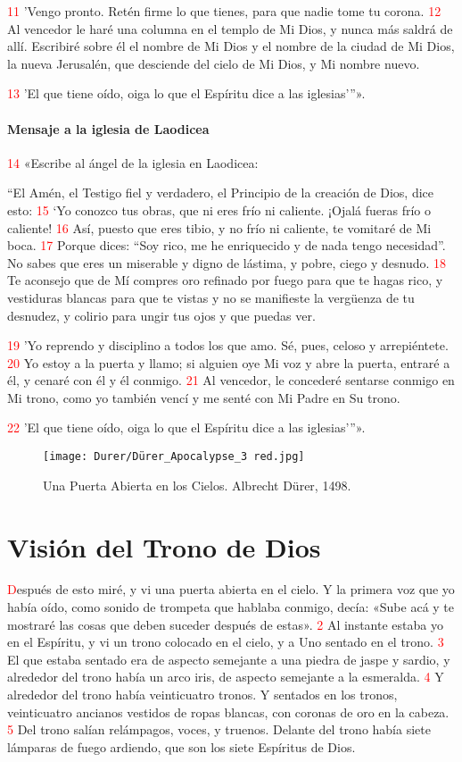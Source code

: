 \documentclass[12pt,twocolumn,twoside]{book}
\newcommand{\vnum}[1]{\textcolor{red}{\normalsize{#1}}}
\begin{document}
\vnum{11} ’Vengo pronto. Retén firme lo que tienes, para que nadie tome tu corona. %
\vnum{12} Al vencedor le haré una columna en el templo de Mi Dios, y nunca más saldrá de allí. Escribiré sobre él el nombre de Mi Dios y el nombre de la ciudad de Mi Dios, la nueva Jerusalén, que desciende del cielo de Mi Dios, y Mi nombre nuevo.

\vnum{13} ’El que tiene oído, oiga lo que el Espíritu dice a las iglesias’”».
\subsubsection*{Mensaje a la iglesia de Laodicea}
\vnum{14} «Escribe al ángel de la iglesia en Laodicea:

“El Amén, el Testigo fiel y verdadero, el Principio de la creación de Dios, dice esto: %
\vnum{15} ‘Yo conozco tus obras, que ni eres frío ni caliente. ¡Ojalá fueras frío o caliente! %
\vnum{16} Así, puesto que eres tibio, y no frío ni caliente, te vomitaré de Mi boca. %
\vnum{17} Porque dices: “Soy rico, me he enriquecido y de nada tengo necesidad”. No sabes que eres un miserable y digno de lástima, y pobre, ciego y desnudo. %
\vnum{18} Te aconsejo que de Mí compres oro refinado por fuego para que te hagas rico, y vestiduras blancas para que te vistas y no se manifieste la vergüenza de tu desnudez, y colirio para ungir tus ojos y que puedas ver.

\vnum{19} ’Yo reprendo y disciplino a todos los que amo. Sé, pues, celoso y arrepiéntete. %
\vnum{20} Yo estoy a la puerta y llamo; si alguien oye Mi voz y abre la puerta, entraré a él, y cenaré con él y él conmigo. %
\vnum{21} Al vencedor, le concederé sentarse conmigo en Mi trono, como yo también vencí y me senté con Mi Padre en Su trono.

\vnum{22} ’El que tiene oído, oiga lo que el Espíritu dice a las iglesias’”».
\clearpage

\begin{figure*}[p!]
	\centering
       \texttt{[image: Durer/Dürer\_Apocalypse\_3 red.jpg]}    
    	\caption{Una Puerta Abierta en los Cielos. Albrecht Dürer, 1498.}
\end{figure*}
\chapter{Visión del Trono de Dios}
\lettrine[lines=4]{\textcolor{red}{D}}{}espués de esto miré, y vi una puerta abierta en el cielo. Y la primera voz que yo había oído, como sonido de trompeta que hablaba conmigo, decía: «Sube acá y te mostraré las cosas que deben suceder después de estas». %
\vnum{2} Al instante estaba yo en el Espíritu, y vi un trono colocado en el cielo, y a Uno sentado en el trono. %
\vnum{3} El que estaba sentado era de aspecto semejante a una piedra de jaspe y sardio, y alrededor del trono había un arco iris, de aspecto semejante a la esmeralda. %
\vnum{4} Y alrededor del trono había veinticuatro tronos. Y sentados en los tronos, veinticuatro ancianos vestidos de ropas blancas, con coronas de oro en la cabeza. %
\vnum{5} Del trono salían relámpagos, voces, y truenos. Delante del trono había siete lámparas de fuego ardiendo, que son los siete Espíritus de Dios.
\end{document}
